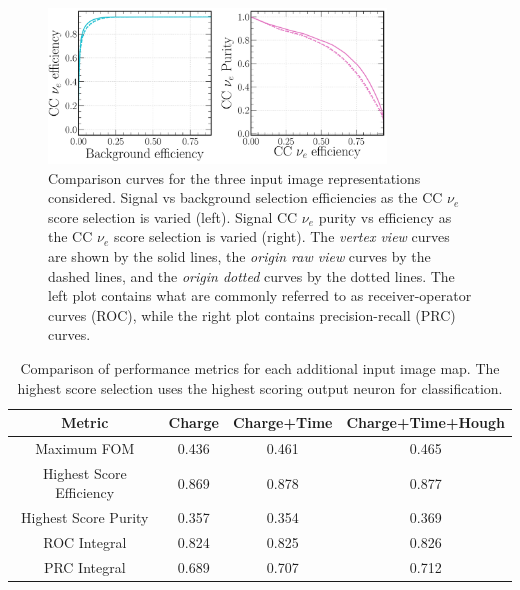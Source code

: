 \begin{figure} %
    \includegraphics[width=0.8\textwidth]{diagrams/7-results/repr_nuel_comp_curves.pdf}
    \caption[Comparison curves for the three input image representations considered]
    {Comparison curves for the three input image representations considered. Signal vs background
        selection efficiencies as the CC $\nu_{e}$ score selection is varied (left). Signal CC
        $\nu_{e}$ purity vs efficiency as the CC $\nu_{e}$ score selection is varied (right). The
        \emph{vertex view} curves are shown by the solid lines, the \emph{origin raw view} curves
        by the dashed lines, and the \emph{origin dotted} curves by the dotted lines. The left
        plot contains what are commonly referred to as receiver-operator curves (ROC), while the
        right plot contains precision-recall (PRC) curves.}
    \label{fig:repr_nuel_comp_curves}
\end{figure}

\begin{table}
    \begin{tabular}{cccc}
        Metric                   & Charge & Charge+Time & Charge+Time+Hough \\
        \midrule
        Maximum FOM              & 0.436  & 0.461       & 0.465             \\
        Highest Score Efficiency & 0.869  & 0.878       & 0.877             \\
        Highest Score Purity     & 0.357  & 0.354       & 0.369             \\
        ROC Integral             & 0.824  & 0.825       & 0.826             \\
        PRC Integral             & 0.689  & 0.707       & 0.712             \\
    \end{tabular}
    \caption[Comparison of performance metrics for each additional input image map.]
    {Comparison of performance metrics for each additional input image map. The highest score
        selection uses the highest scoring output neuron for classification.}
    \label{tab:chan}
\end{table}

